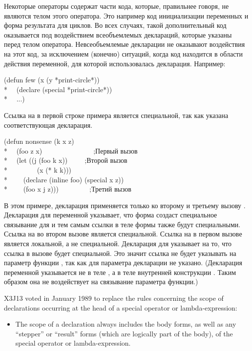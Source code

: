 \begin{defspec}
Некоторые операторы содержат части кода, которые, правильнее говоря,
не являются телом этого оператора. Это например код инициализации
переменных и форма результата для циклов.  Во всех случаях, такой
дополнительный код оказывается под воздействием всеобъемлемых
деклараций, которые указаны перед телом оператора.
Невсеобъемлемые декларации не оказывают воздействия на этот код, за
исключением (конечно) ситуаций, когда код находится в области действия
переменной, для которой использовалась декларация.  Например:
\begin{lisp}
(defun few (x  (y *print-circle*)) \\*
~~(declare (special *print-circle*)) \\*
~~...)
\end{lisp}
Ссылка на  в первой строке примера является специальной, так
как указана соответствующая декларация.
\begin{lisp}
(defun nonsense (k x z) \\*
~~(foo z x)~~~~~~~~~~~~~~~;\textrm{Первый вызов } \\*
~~(let ((j (foo k x))~~~~~;\textrm{Второй вызов } \\*
~~~~~~~~(x (* k k))) \\*
~~~~(declare (inline foo) (special x z)) \\*
~~~~(foo x j z)))~~~~~~~~~;\textrm{Третий вызов }
\end{lisp}
В этом примере, декларация  применяется только ко второму и третьему вызову
.
Декларация  для переменной  указывает, что форма 
создаст специальное связывание для  и тем самым ссылки в теле формы также
будут специальными.
Ссылка на  во втором вызове  является специальной.
Ссылка на  в первом вызове  является локальной, а не специальной.
Декларация  для  указывает на то, что ссылка в вызове
 будет специальной. Это значит ссылка не будет указывать на параметр
функции , так как для параметра декларации  не
указано.
(Декларация  переменной  указывается не в теле , а
в теле внутренней конструкции . Таким образом она не воздействует на
связывание параметра функции.)
\begin{new}
X3J13 voted in January 1989
to replace the rules concerning the scope of
declarations occurring at the head of a special operator or lambda-expression:
\begin{itemize}
\item The scope of a declaration always includes the body forms, as well as any
``stepper'' or ``result'' forms (which are logically part of the body), of the
special operator or lambda-expression.


\end{itemize}
\end{new}
\end{defspec}

